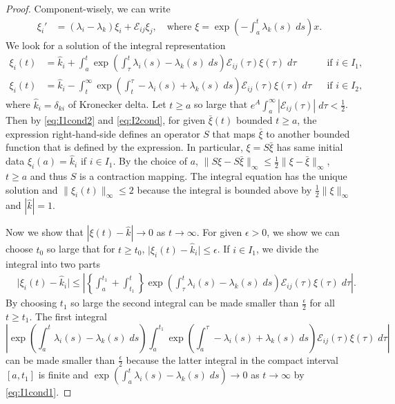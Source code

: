 \documentclass[a4paper,11pt]{article}
\theoremstyle{remark}
\begin{document}
\begin{proof}
Component-wisely, we can write
\begin{align*}
 \xi_i' & = (\lambda_i-\lambda_k)\xi_i + \mathcal{E}_{ij}\xi_j, \quad \text{where $\xi = \exp\left(-\int_a^t \lambda_k(s) \; ds\right)x$.}
\end{align*}
We look for a solution of the integral representation
\begin{align*}
 \xi_i(t) &= \hat{k}_i + \int_a^t \exp\left(\int_\tau^t \lambda_i(s)-\lambda_k(s) \; ds\right)\mathcal{E}_{ij}(\tau)\xi(\tau) \; d\tau && \text{if $i\in I_1$,}\\
 \xi_i(t) &= \hat{k}_i -\int_t^\infty \exp\left(\int_t^\tau -\lambda_i(s)+\lambda_k(s) \; ds\right)\mathcal{E}_{ij}(\tau)\xi(\tau) \; d\tau && \text{if $i\in I_2$,}
\end{align*}
where $\hat{k}_i = \delta_{k i}$ of Kronecker delta. Let $t\ge a$ so large that $e^A\int_a^\infty |\mathcal{E}_{ij}(\tau)|\; d\tau < \frac{1}{2}$. Then by \eqref{eq:I1cond2} and \eqref{eq:I2cond}, for given $\bar\xi(t)$ bounded $t\ge a$, the expression right-hand-side defines an operator $S$ that maps $\bar\xi$ to another bounded function that is defined by the expression. In particular, $\xi=S\bar\xi$ has same initial data $\xi_i(a) = \hat{k}_i$ if $i\in I_1$.
By the choice of $a$, $\|S\xi - S\bar\xi\|_\infty \le \frac{1}{2}\|\xi-\bar\xi\|_\infty$, $t\ge a$ and thus $S$ is a contraction mapping. The integral equation has the unique solution and $\|\xi_i(t)\|_\infty \le 2$ because the integral is bounded above by $ \frac{1}{2} \|\xi\|_\infty$ and $|\hat{k}|=1$.

Now we show that $|\xi(t)-\hat{k}| \rightarrow 0$ as $t \rightarrow \infty$. For given $\epsilon>0$, we show we can choose $t_0$ so large that for $t\ge t_0$, $\big|\xi_i(t)-\hat{k}_i\big| \le \epsilon$. If $i\in I_1$, we divide the integral into two parts
\begin{align*}
 &\big|\xi_i(t)-\hat{k}_i\big| \le \left|\left\{ \int_a^{t_1} + \int_{t_1}^t \right\} \exp\left(\int_\tau^t \lambda_i(s)-\lambda_k(s) \; ds\right)\mathcal{E}_{ij}(\tau)\xi(\tau) \; d\tau \right|.
\end{align*}
By choosing $t_1$ so large the second integral can be made smaller than $ \frac{\epsilon}{2}$ for all $t\ge t_1$. The first integral $$\left|\exp\left(\int_a^t \lambda_i(s)-\lambda_k(s) \; ds\right)\int_a^{t_1} \exp\left(\int_a^\tau -\lambda_i(s)+\lambda_k(s) \; ds\right)\mathcal{E}_{ij}(\tau)\xi(\tau) \; d\tau \right|$$
can be made smaller than $ \frac{\epsilon}{2}$ because the latter integral in the compact interval $[a, t_1]$ is finite and $\exp\left(\int_a^t \lambda_i(s)-\lambda_k(s) \; ds\right) \rightarrow 0$ as $t \rightarrow \infty$ by \eqref{eq:I1cond1}.


\end{proof}
\end{document}
